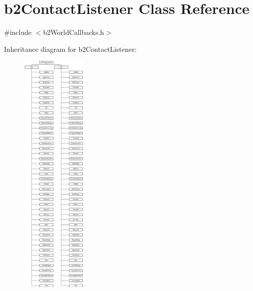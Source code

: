 \hypertarget{classb2_contact_listener}{\section{b2\-Contact\-Listener Class Reference}
\label{classb2_contact_listener}
}


{\ttfamily \#include $<$b2\-World\-Callbacks.\-h$>$}

Inheritance diagram for b2\-Contact\-Listener\-:\begin{figure}[H]
\begin{center}
\leavevmode
\includegraphics[height=12.000000cm]{classb2_contact_listener}
\end{center}
\end{figure}

